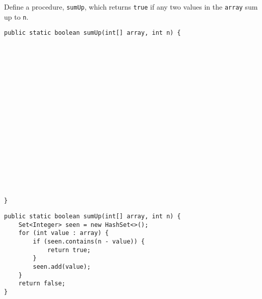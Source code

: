 \question Define a procedure, \texttt{sumUp}, which returns \texttt{true} if any two values in the \texttt{array} sum up to \texttt{n}.

\ifprintanswers\else
\begin{lstlisting}
public static boolean sumUp(int[] array, int n) {



















}
\end{lstlisting}
\fi

\begin{solution}
\begin{lstlisting}
public static boolean sumUp(int[] array, int n) { 
    Set<Integer> seen = new HashSet<>();
    for (int value : array) {
        if (seen.contains(n - value)) {
            return true;
        }
        seen.add(value);
    }
    return false;
}
\end{lstlisting}
\end{solution}